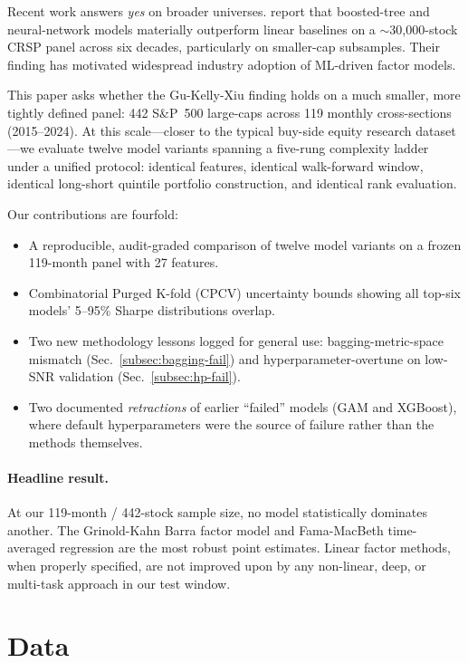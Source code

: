 \documentclass[11pt]{article}
\begin{document}
Recent work answers \emph{yes} on broader universes. \citet{gu_kelly_xiu}
report that boosted-tree and neural-network models materially outperform
linear baselines on a $\sim$30,000-stock CRSP panel across six decades,
particularly on smaller-cap subsamples. Their finding has motivated
widespread industry adoption of ML-driven factor models.

This paper asks whether the Gu-Kelly-Xiu finding holds on a much smaller,
more tightly defined panel: 442 S\&P~500 large-caps across 119 monthly
cross-sections (2015--2024). At this scale---closer to the typical
buy-side equity research dataset---we evaluate twelve model variants
spanning a five-rung complexity ladder under a unified protocol:
identical features, identical walk-forward window, identical
long-short quintile portfolio construction, and identical rank
evaluation.

Our contributions are fourfold:
\begin{itemize}[leftmargin=2em,topsep=2pt,itemsep=2pt]
\item A reproducible, audit-graded comparison of twelve model variants
  on a frozen 119-month panel with 27 features.
\item Combinatorial Purged K-fold (CPCV) uncertainty bounds showing
  all top-six models' 5--95\% Sharpe distributions overlap.
\item Two new methodology lessons logged for general use:
  bagging-metric-space mismatch (Sec.~\ref{subsec:bagging-fail}) and
  hyperparameter-overtune on low-SNR validation
  (Sec.~\ref{subsec:hp-fail}).
\item Two documented \emph{retractions} of earlier ``failed'' models
  (GAM and XGBoost), where default hyperparameters were the source of
  failure rather than the methods themselves.
\end{itemize}

\paragraph{Headline result.}
At our 119-month / 442-stock sample size, no model statistically
dominates another. The Grinold-Kahn Barra factor model and
Fama-MacBeth time-averaged regression are the most robust point
estimates. Linear factor methods, when properly specified, are not
improved upon by any non-linear, deep, or multi-task approach in our
test window.

\section{Data}\label{sec:data}
\end{document}
